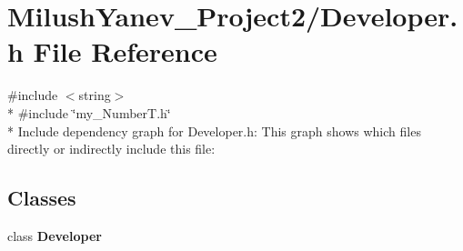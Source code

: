 \section{Milush\+Yanev\+\_\+\+Project2/\+Developer.h File Reference}
\label{_developer_8h}
{\ttfamily \#include $<$string$>$}\\*
{\ttfamily \#include \char`\"{}my\+\_\+\+Number\+T.\+h\char`\"{}}\\*
Include dependency graph for Developer.\+h\+:
This graph shows which files directly or indirectly include this file\+:
\subsection*{Classes}
\begin{DoxyCompactItemize}
\item 
class {\bf Developer}
\end{DoxyCompactItemize}
